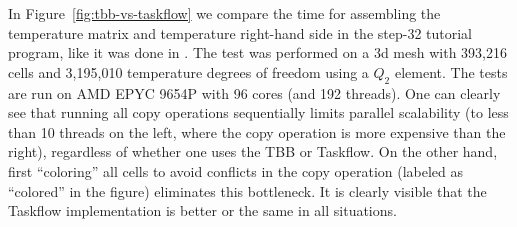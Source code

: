 \documentclass{ansarticle-preprint}
\begin{document}
In Figure~\ref{fig:tbb-vs-taskflow} we compare the time for assembling
the temperature matrix and temperature right-hand side in the step-32
tutorial program, like it was done in \cite{TKB16}. The test was performed
on a 3d mesh with 393,216 cells and 3,195,010 temperature degrees of freedom
using a $Q_2$ element. The tests are run
on AMD EPYC 9654P with 96 cores (and 192 threads). One can clearly see that
running all copy operations sequentially limits parallel scalability (to less than 10
threads on the left, where the copy operation is more expensive than
the right), regardless of whether one uses the TBB or Taskflow. On the
other hand, first ``coloring'' all cells to avoid conflicts in
the copy operation (labeled as ``colored'' in the figure) eliminates this bottleneck.
It is clearly visible that the Taskflow implementation is better or the same
in all situations.
\end{document}
